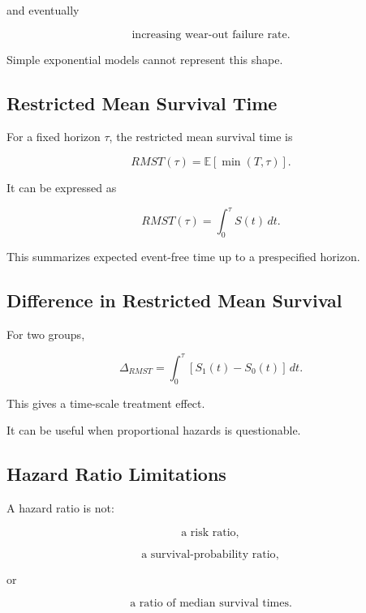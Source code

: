 and eventually

\[
\boxed{
\text{increasing wear-out failure rate}.
}
\]

Simple exponential models cannot represent this shape.

\subsection{Restricted Mean Survival Time}
\label{subsec:restricted-mean-survival-time}

For a fixed horizon \(\tau\), the restricted mean survival time is

\[
\boxed{
RMST(\tau)
=
\mathbb{E}
[
\min(T,\tau)
].
}
\]

It can be expressed as

\[
\boxed{
RMST(\tau)
=
\int_0^\tau
S(t)\,dt.
}
\]

This summarizes expected event-free time up to a prespecified horizon.

\subsection{Difference in Restricted Mean Survival}
\label{subsec:rmst-difference}

For two groups,

\[
\boxed{
\Delta_{RMST}
=
\int_0^\tau
[
S_1(t)-S_0(t)
]
\,dt.
}
\]

This gives a time-scale treatment effect.

It can be useful when proportional hazards is questionable.

\subsection{Hazard Ratio Limitations}
\label{subsec:hazard-ratio-limitations}

A hazard ratio is not:

\[
\boxed{
\text{a risk ratio},
}
\]

\[
\boxed{
\text{a survival-probability ratio},
}
\]

or

\[
\boxed{
\text{a ratio of median survival times}.
}
\]


